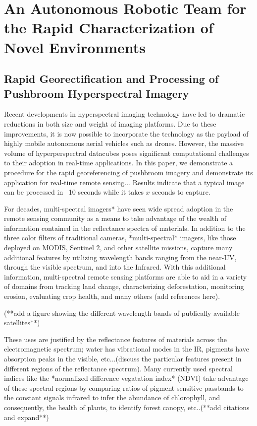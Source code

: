 \chapter{An Autonomous Robotic Team for the Rapid Characterization of Novel Environments}

\section{Rapid Georectification and Processing of Pushbroom Hyperspectral Imagery}

Recent developments in hyperspectral imaging technology have led to dramatic reductions in both size and weight of imaging platforms. Due to these improvements, it is now possible to incorporate the technology as the payload of highly mobile autonomous aerial vehicles such as drones. However, the massive volume of hyperperspectral datacubes poses significant computational challenges to their adoption in real-time applications. In this paper, we demonstrate a procedure for the rapid georeferencing of pushbroom imagery and demonstrate its application for real-time remote sensing... Results indicate that a typical image can be processed in ~10 seconds while it takes $x$ seconds to capture. 



For decades, multi-spectral imagers* have seen wide spread adoption in the remote sensing community as a means to take advantage of the wealth of information contained in the reflectance spectra of materials. In addition to the three color filters of traditional cameras, *multi-spectral* imagers, like those deployed on MODIS, Sentinel 2, and other satellite missions, capture many additional features by utilizing wavelength bands ranging from the near-UV, through the visible spectrum, and into the Infrared. With this additional information, multi-spectral remote sensing platforms are able to aid in a variety of domains from tracking land change, characterizing deforestation, monitoring erosion, evaluating crop health, and many others (add references here). 

(**add a figure showing the different wavelength bands of publically available satellites**)

These uses are justified by the reflectance features of materials across the electromagnetic spectrum; water has vibrational modes in the IR, pigments have absorption peaks in the visible, etc...(discuss the particular features present in different regions of the reflectance spectrum). Many currently used spectral indices like the *normalized difference vegatation index* (NDVI) take advantage of these spectral regions by comparing ratios of pigment sensitive passbands to the constant signals infrared to infer the abundance of chlorophyll, and consequently, the health of plants, to identify forest canopy, etc..(**add citations and expand**)

